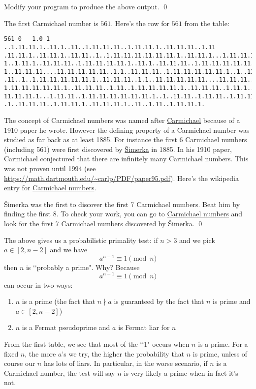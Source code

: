 \begin{ex}
  Modify your program to produce the above output.
  \qed
\end{ex}

The first Carmichael number is $561$. Here's the row for $561$
from the table:
\begin{Verbatim}[frame=single,fontsize=\footnotesize]
561 0   1.0 1 ..1.11.11.1..11.1..11..1.11.11.11..1.11.11.1..11.11.11..1.11
.11.11.1..11.11.1..11.11..1..1.11.11.11.11.11.11.1..11.11.1...1.11.11.11.1
1..1.11.1..11.11.11..1.11.11.11.11.1..11.1..11.11.11..1.11.11.11.11.11.11.
1..11.11.11....11.11.11.11.11..1.1..11.11.11..1.11.11.11.11.11.1..1..11.11
.11..1..1.11.11.11.11.11.1..11.11.11..1.1..11.11.11.11.11....11.11.11..1.1
1.11.11.11.11.11.1..11.11.11..1.11..1.11.11.11.11.1..11.11.11..1.11.1..11.
11.11.11.1...1.11.11..1.11.11.11.11.11.11.1..1..11.11..1.11.11..1.11.11.11
.1..11.11.11..1.11.11.1..11.11.11.1..11..1.11..1.11.11.1.
\end{Verbatim}

The concept of Carmichael numbers was named after
\href{https://en.wikipedia.org/wiki/Robert_Daniel_Carmichael}{Carmichael}
because of a 1910 paper he wrote.
However the defining property of a Carmichael number was studied as far back
as at least 1885.
For instance the first 6 Carmichael numbers (including 561) were
first discovered by
\href{https://en.wikipedia.org/wiki/V%C3%A1clav_%C5%A0imerka}{\v{S}imerka}
in 1885.
In his 1910 paper,
Carmichael conjectured that there are infinitely many Carmichael numbers.
This was not proven until 1994
(see \url{https://math.dartmouth.edu/~carlp/PDF/paper95.pdf}).
Here's the wikipedia entry for
\href{https://en.wikipedia.org/wiki/Carmichael_number}{Carmichael numbers}.

\begin{ex}
  \v{S}imerka was the first to discover the first 7 Carmichael numbers.
  Beat him by finding the first 8.
  To check your work, you can go to 
  \href{https://en.wikipedia.org/wiki/Carmichael_number}{Carmichael numbers}
  and look for the first 7 Carmichael numbers discovered by \v{S}imerka.
  \qed
\end{ex}

The above gives us a probabilistic primality test:
if $n > 3$ and we pick $a \in [2, n-2]$ and we have
\[
a^{n-1} \equiv 1 \pmod{n}
\]
then $n$ is \lq\lq probably a prime".
Why?
Because
\[
a^{n-1} \equiv 1 \pmod{n}
\]
can occur in two ways:
\begin{enumerate}[nosep]
\item $n$ is a prime (the fact that $n \nmid a$ is guaranteed by the fact that
  $n$ is prime and $a \in [2, n-2]$)
\item $n$ is a Fermat pseudoprime and $a$ is Fermat liar for $n$
\end{enumerate}
From the first table, we see that most of the \lq\lq 1" occurs when
$n$ is a prime.
For a fixed $n$,
the more $a$'s we try, the higher the probability that $n$ is prime,
unless of course our $n$ has lots of liars.
In particular, in the worse scenario, if $n$ is a Carmichael number,
the test will say $n$ is very likely a prime when in fact it's not.

